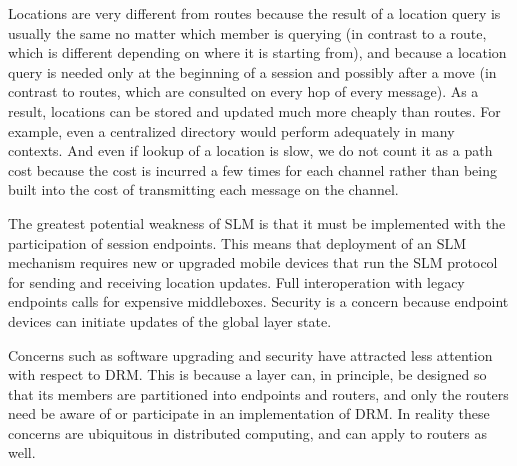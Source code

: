 Locations are very different from routes because the result of a location
query is usually the same no matter which member is querying (in
contrast to a route, which is different depending on where it is
starting from), and because a location query is needed only at the
beginning of a session and possibly after a move (in contrast to routes,
which are consulted on every hop of every message).
As a result, locations can be stored and updated much more cheaply
than routes.
For example, even a centralized directory would perform adequately
in many contexts.
And even if lookup of a location is slow, we do not count it as a
path cost because the cost is incurred a few times for each channel
rather than 
being built into the cost of transmitting each message on the channel.

The greatest potential
weakness of SLM is that it must be implemented with
the participation of session endpoints.
This means that deployment of an SLM mechanism requires new or
upgraded mobile devices that run the SLM protocol for sending and
receiving location updates.
Full interoperation with legacy endpoints calls for expensive middleboxes.
Security is a concern because endpoint devices can initiate
updates of the global layer state.

Concerns such as software upgrading and security have attracted less
attention with respect to DRM.
This is because a layer can, in principle, be designed so
that its members are partitioned into endpoints and routers, and
only the routers need be aware of or participate in an implementation
of DRM.
In reality these concerns are ubiquitous in distributed computing, and
can apply to routers as well.
